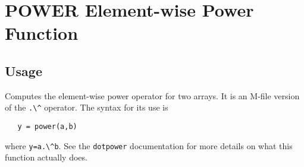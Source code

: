 \section{POWER Element-wise Power Function}

\subsection{Usage}

Computes the element-wise power operator for two arrays.  It is an
M-file version of the \verb|.\^| operator.  The syntax for its use is
\begin{verbatim}
   y = power(a,b)
\end{verbatim}
where \verb|y=a.\^b|.  See the \verb|dotpower| documentation for more
details on what this function actually does.
